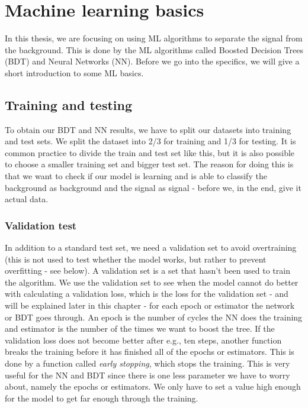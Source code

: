 \section{Machine learning basics}
In this thesis, we are focusing on using ML algorithms to separate the signal from the background. This is done by the ML algorithms called Boosted Decision Trees (BDT) and Neural Networks (NN). Before we go into the specifics, we will give a short introduction to some ML basics.

\subsection{Training and testing}
\label{sec:TandT}
To obtain our BDT and NN results, we have to split our datasets into training and test sets. We split the dataset into 2/3 for training and 1/3 for testing. It is common practice to divide the train and test set like this, but it is also possible to choose a smaller training set and bigger test set. The reason for doing this is that we want to check if our model is learning and is able to classify the background as background and the signal as signal - before we, in the end, give it actual data. 

\subsubsection{Validation test}
In addition to a standard test set, we need a validation set to avoid overtraining (this is not used to test whether the model works, but rather to prevent overfitting - see below). A validation set is a set that hasn't been used to train the algorithm. We use the validation set to see when the model cannot do better with calculating a validation loss, which is the loss for the validation set - and will be explained later in this chapter - for each epoch or estimator the network or BDT goes through. An epoch is the number of cycles the NN does the training and estimator is the number of the times we want to boost the tree. If the validation loss does not become better after e.g., ten steps, another function breaks the training before it has finished all of the epochs or estimators. This is done by a function called \textit{early stopping}, which stops the training. This is very useful for the NN and BDT since there is one less parameter we have to worry about, namely the epochs or estimators. We only have to set a value high enough for the model to get far enough through the training. 

